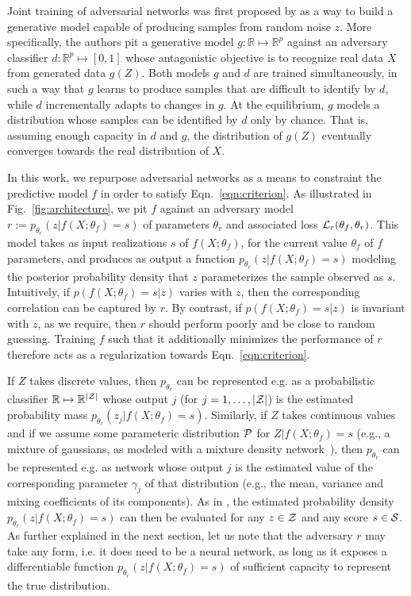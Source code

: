 \documentclass[twocolumn,superscriptaddress,aps]{revtex4-1}
\theoremstyle{plain}
\begin{document}
Joint training of adversarial networks was first proposed by \citep{goodfellow2014generative} as a
way to build a generative model capable of producing samples from random noise
$z$. More specifically, the authors pit a generative model $g:
\mathbb{R} \mapsto \mathbb{R}^p$ against an adversary classifier $d :
\mathbb{R}^p \mapsto [0, 1]$ whose antagonistic objective is to recognize
real data $X$ from generated data $g(Z)$. Both models $g$ and $d$ are trained
simultaneously, in such a way that $g$ learns to produce samples that are
difficult to identify by $d$, while $d$ incrementally adapts to changes in $g$.
At the equilibrium, $g$ models a distribution whose samples can be identified by
$d$ only by chance. That is, assuming enough capacity in $d$ and  $g$, the
distribution of $g(Z)$ eventually converges towards the real distribution
of $X$.

In this work, we repurpose adversarial networks as a means to constraint the
predictive model $f$ in order to satisfy Eqn.~\ref{eqn:criterion}. As
illustrated in Fig.~\ref{fig:architecture}, we pit $f$ against an adversary
model $r := p_{\theta_r}(z | f(X;\theta_f)=s)$ of parameters $\theta_r$ and
associated loss ${\cal L}_r(\theta_f, \theta_r)$. This model takes  as input
realizations $s$ of $f(X; \theta_f)$, for the current value $\theta_f$ of $f$
parameters, and produces as output a function $p_{\theta_r}(z | f(X;\theta_f)=s)$
modeling the posterior probability density that $z$ parameterizes the sample
observed as $s$.
Intuitively, if $p(f(X; \theta_f)=s|z)$ varies with $z$,
then the corresponding correlation can be captured by $r$. By contrast, if
$p(f(X; \theta_f)=s|z)$ is invariant with $z$, as we require, then $r$ should
perform poorly and be close to random guessing. Training $f$ such that it
additionally minimizes the performance of $r$ therefore acts as a regularization
towards Eqn.~\ref{eqn:criterion}.

If $Z$ takes discrete values, then $p_{\theta_r}$ can be represented e.g. as a
probabilistic classifier $\mathbb{R} \mapsto \mathbb{R}^{|{\cal Z|}}$ whose
output $j$ (for $j=1, \dots, |{\cal Z}|$) is the estimated probability mass
$p_{\theta_r}(z_j|f(X;\theta_f)=s)$. Similarly, if $Z$ takes continuous values and
if we assume some parameteric distribution ${\cal P}$ for $Z|f(X;\theta_f)=s$
(e.g., a mixture of gaussians, as modeled with a mixture
density network~\citep{bishop1994mixture}), then $p_{\theta_r}$ can be
represented e.g. as network whose output $j$ is the estimated value of the
corresponding parameter $\gamma_j$ of that distribution (e.g., the mean,
variance and mixing coefficients of its components). As in
\citep{nix1994estimating,bishop1994mixture}, the estimated probability density
$p_{\theta_r}(z|f(X;\theta_f)=s)$ can then be evaluated for any $z \in {\cal Z}$ and any score $s \in {\cal S}$.
As further explained in the next section, let us note that the adversary $r$ may
take any form, i.e. it does need to be a neural network, as long as it exposes a
differentiable function $p_{\theta_r}(z|f(X;\theta_f)=s)$ of sufficient capacity
to represent the true distribution.
\end{document}
